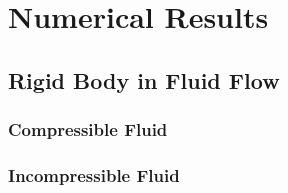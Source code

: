 \chapter{Numerical Results}

\section{Rigid Body in Fluid Flow}

\subsection*{Compressible Fluid}

\subsection*{Incompressible Fluid}



